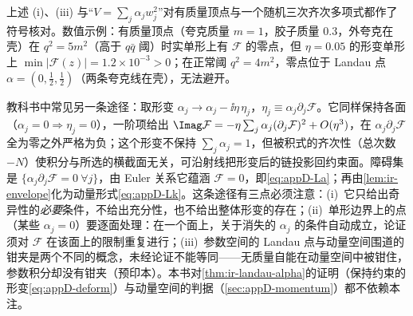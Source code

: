 上述 (i)、(iii) 与“$V=\sum_j\alpha_jw_j^2$”对有质量顶点与一个随机三次齐次多项式都作了符号核对。数值示例：有质量顶点（夸克质量 $m=1$，胶子质量 $0.3$，外夸克在壳）在 $q^2=5m^2$（高于 $q\bar q$ 阈）时实单形上有 $\mathcal F$ 的零点，但 $\eta=0.05$ 的形变单形上 $\min|\mathcal F(z)|=1.2\times10^{-3}>0$；在正常阈 $q^2=4m^2$，零点位于 Landau 点 $\alpha=(0,\frac12,\frac12)$（两条夸克线在壳），无法避开。

\begin{remark}\label{rem:appD-parameter-proof}
教科书中常见另一条途径：取形变 $\alpha_j\to\alpha_j-\ii\eta\,\eta_j$，$\eta_j\equiv\alpha_j\partial_j\mathcal F$。它同样保持各面（$\alpha_j=0\Rightarrow\eta_j=0$），一阶项给出 $\Imag\mathcal F=-\eta\sum_j\alpha_j(\partial_j\mathcal F)^2+O(\eta^3)$，在 $\alpha_j\partial_j\mathcal F$ 全为零之外严格为负；这个形变不保持 $\sum_j\alpha_j=1$，但被积式的齐次性（总次数 $-N$）使积分与所选的横截面无关，可沿射线把形变后的链投影回约束面。障碍集是 $\{\alpha_j\partial_j\mathcal F=0\ \forall j\}$，由 Euler 关系它蕴涵 $\mathcal F=0$，即\cref{eq:appD-La}；再由\cref{lem:ir-envelope}化为动量形式\cref{eq:appD-Lk}。这条途径有三点必须注意：(i)~它只给出奇异性的\emph{必要}条件，不给出充分性，也不给出整体形变的存在；(ii)~单形边界上的点（某些 $\alpha_j=0$）要逐面处理：在一个面上，关于消失的 $\alpha_j$ 的条件自动成立，论证须对 $\mathcal F$ 在该面上的限制重复进行；(iii)~参数空间的 Landau 点与动量空间围道的钳夹是两个不同的概念，未经论证不能等同——无质量自能在动量空间中被钳住，参数积分却没有钳夹\cite[附录~D.1]{Collins:2020euz}（预印本）。本书对\cref{thm:ir-landau-alpha}的证明（保持约束的形变\cref{eq:appD-deform}）与动量空间的判据（\cref{sec:appD-momentum}）都不依赖本注。
\end{remark}

